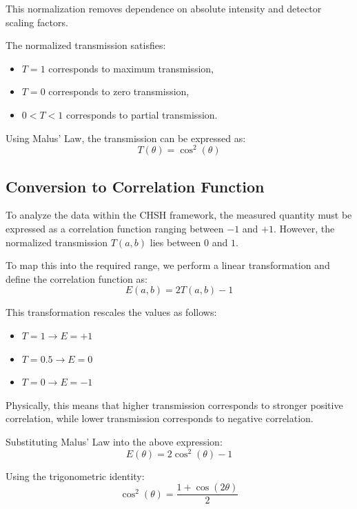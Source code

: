 \documentclass[14pt,a4paper]{extarticle}
\begin{document}
This normalization removes dependence on absolute intensity and detector scaling factors.

The normalized transmission satisfies:
\begin{itemize}
    \item $T = 1$ corresponds to maximum transmission,
    \item $T = 0$ corresponds to zero transmission,
    \item $0 < T < 1$ corresponds to partial transmission.
\end{itemize}

Using Malus' Law, the transmission can be expressed as:
\begin{equation}
T(\theta) = \cos^2(\theta)
\end{equation}


\subsection{Conversion to Correlation Function}

To analyze the data within the CHSH framework, the measured quantity must be expressed as a correlation function ranging between $-1$ and $+1$. However, the normalized transmission $T(a,b)$ lies between $0$ and $1$.

To map this into the required range, we perform a linear transformation and define the correlation function as:
\begin{equation}
E(a,b) = 2T(a,b) - 1
\end{equation}

This transformation rescales the values as follows:
\begin{itemize}
    \item $T = 1 \rightarrow E = +1$
    \item $T = 0.5 \rightarrow E = 0$
    \item $T = 0 \rightarrow E = -1$
\end{itemize}

Physically, this means that higher transmission corresponds to stronger positive correlation, while lower transmission corresponds to negative correlation.

Substituting Malus' Law into the above expression:
\begin{equation}
E(\theta) = 2\cos^2(\theta) - 1
\end{equation}

Using the trigonometric identity:
\begin{equation}
\cos^2(\theta) = \frac{1 + \cos(2\theta)}{2}
\end{equation}
\end{document}
